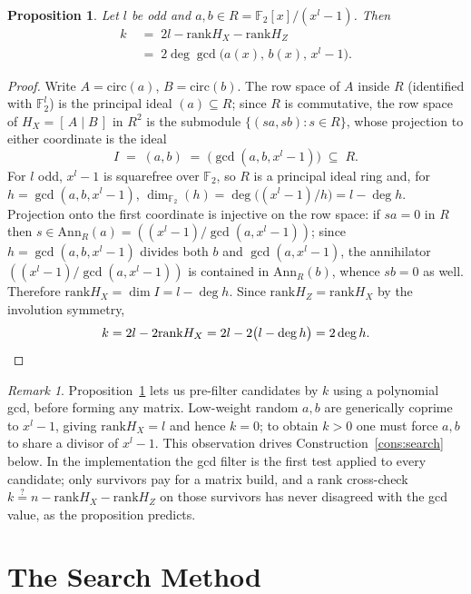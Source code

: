 \documentclass[journal,onecolumn]{IEEEtran}
\newtheorem{proposition}[theorem]{Proposition}
\theoremstyle{definition}
\theoremstyle{remark}
\newtheorem{remark}[theorem]{Remark}
\newcommand{\F}{\mathbb{F}}
\newcommand{\rank}{\mathrm{rank}}
\begin{document}
\begin{proposition}\label{prop:k}
Let $l$ be odd and $a,b\in R=\F_2[x]/(x^l-1)$. Then
\[
\begin{aligned}
k \;&=\; 2l-\rank H_X-\rank H_Z\\
    &=\; 2\deg\gcd\!\big(a(x),\,b(x),\,x^{l}-1\big).
\end{aligned}
\]
\end{proposition}
\begin{proof}
Write $A=\mathrm{circ}(a)$, $B=\mathrm{circ}(b)$. The row space of $A$
inside $R$ (identified with $\F_2^{l}$) is the principal ideal $(a)\subseteq
R$; since $R$ is commutative, the row space of $H_X=[\,A\mid B\,]$ in
$R^2$ is the submodule $\{(sa,sb):s\in R\}$, whose projection to either
coordinate is the ideal
\[
I\;=\;(a,b)\;=\;\bigl(\gcd(a,b,x^{l}-1)\bigr)\;\subseteq\; R .
\]
For $l$ odd, $x^{l}-1$ is squarefree over $\F_2$, so $R$ is a principal
ideal ring and, for $h=\gcd(a,b,x^{l}-1)$,
$\dim_{\F_2}(h)=\deg\!\big((x^{l}-1)/h\big)=l-\deg h$. Projection onto the
first coordinate is injective on the row space: if $sa=0$ in $R$ then
$s\in\mathrm{Ann}_R(a)=((x^{l}-1)/\gcd(a,x^{l}-1))$; since
$h=\gcd(a,b,x^{l}-1)$ divides both $b$ and $\gcd(a,x^{l}-1)$, the annihilator
$((x^{l}-1)/\gcd(a,x^{l}-1))$ is contained in $\mathrm{Ann}_R(b)$, whence
$sb=0$ as well. Therefore $\rank H_X=\dim I=l-\deg h$. Since
$\rank H_Z=\rank H_X$ by the involution symmetry,
\[
k=2l-2\rank H_X=2l-2\bigl(l-\deg h\bigr)=2\deg h. \qedhere
\]
\end{proof}

\begin{remark}\label{rem:prefilter}
Proposition~\ref{prop:k} lets us pre-filter candidates by $k$ using a
polynomial gcd, before forming any matrix. Low-weight random $a,b$ are
generically coprime to $x^l-1$, giving $\rank H_X=l$ and hence $k=0$; to
obtain $k>0$ one must force $a,b$ to share a divisor of $x^l-1$. This
observation drives Construction~\ref{cons:search} below. In the
implementation the gcd filter is the first test applied to every candidate;
only survivors pay for a matrix build, and a rank cross-check
$k\stackrel{?}{=}n-\rank H_X-\rank H_Z$ on those survivors has never
disagreed with the gcd value, as the proposition predicts.
\end{remark}

\section{The Search Method}\label{sec:method}
\end{document}
